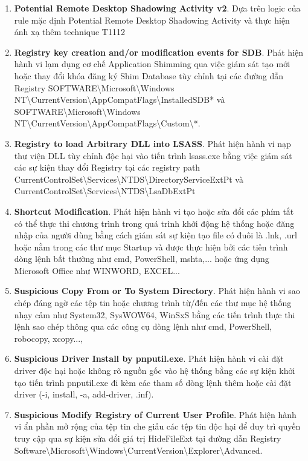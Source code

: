 \begin{enumerate}
\item \textbf{Potential Remote Desktop Shadowing Activity v2}. Dựa trên logic của rule mặc định Potential Remote Desktop Shadowing Activity và thực hiện ánh xạ thêm technique T1112
\item \textbf{Registry key creation and/or modification events for SDB}. Phát hiện hành vi lạm dụng cơ chế Application Shimming qua việc giám sát tạo mới hoặc thay đổi khóa đăng ký Shim Database tùy chỉnh tại các đường dẫn Registry SOFTWARE\textbackslash{}Microsoft\textbackslash{}Windows NT\textbackslash{}CurrentVersion\textbackslash{}AppCompatFlags\textbackslash{}InstalledSDB* và SOFTWARE\textbackslash{}Microsoft\textbackslash{}Windows NT\textbackslash{}CurrentVersion\textbackslash{}AppCompatFlags\textbackslash{}Custom\textbackslash{}*.
\item \textbf{Registry to load Arbitrary DLL into LSASS}. Phát hiện hành vi nạp thư viện DLL tùy chỉnh độc hại vào tiến trình lsass.exe bằng việc giám sát các sự kiện thay đổi Registry tại các registry path CurrentControlSet\textbackslash{}Services\textbackslash{}NTDS\textbackslash{}DirectoryServiceExtPt và CurrentControlSet\textbackslash{}Services\textbackslash{}NTDS\textbackslash{}LsaDbExtPt
\item \textbf{Shortcut Modification}. Phát hiện hành vi tạo hoặc sửa đổi các phím tắt có thể thực thi chương trình trong quá trình khởi động hệ thống hoặc đăng nhập của người dùng bằng cách giám sát sự kiện tạo file có đuôi là .lnk, .url hoặc nằm trong các thư mục Startup và được thực hiện bởi các tiến trình dòng lệnh bất thường như cmd, PowerShell, mshta,... hoặc ứng dụng Microsoft Office như WINWORD, EXCEL...
\item \textbf{Suspicious Copy From or To System Directory}. Phát hiện hành vi sao chép đáng ngờ các tệp tin hoặc chương trình từ/đến các thư mục hệ thống nhạy cảm như System32, SysWOW64, WinSxS bằng các tiến trình thực thi lệnh sao chép thông qua các công cụ dòng lệnh như cmd, PowerShell, robocopy, xcopy...,
\item \textbf{Suspicious Driver Install by pnputil.exe}. Phát hiện hành vi cài đặt driver độc hại hoặc không rõ nguồn gốc vào hệ thống bằng các sự kiện khởi tạo tiến trình pnputil.exe đi kèm các tham số dòng lệnh thêm hoặc cài đặt driver (-i, install, -a, add-driver, .inf).
\item \textbf{Suspicious Modify Registry of Current User Profile}. Phát hiện hành vi ẩn phần mở rộng của tệp tin che giấu các tệp tin độc hại để duy trì quyền truy cập qua sự kiện sửa đổi giá trị HideFileExt tại đường dẫn Registry Software\textbackslash{}Microsoft\textbackslash{}Windows\textbackslash{}CurrentVersion\textbackslash{}Explorer\textbackslash{}Advanced.

\end{enumerate}
